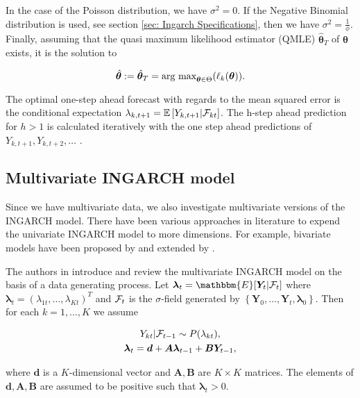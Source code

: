 In the case of the Poisson distribution, we have $\sigma^2=0$. If the Negative Binomial distribution is used, see section \ref{sec: Ingarch Specifications}, then we have $\sigma^2=\frac{1}{\phi}$. 
Finally, assuming that the quasi maximum likelihood estimator (QMLE) $\hat{\bm{\theta}}_T$ of $\bm{\theta}$ exists, it is the solution to 

\begin{equation}
\hat{\bm{\theta}}:= \hat{\bm{\theta}}_T = \text{arg max}_{\bm{\theta} \in \Theta} (\ell_k(\bm{\theta})). 
\label{eq:ingarch qmle}
\end{equation}

The optimal one-step ahead forecast with regards to the mean squared error is the conditional expectation $\lambda_{k,t+1}=\mathbb{E}\left[Y_{k,t+1} | \mathcal{F}_{kt} \right]$. The h-step ahead prediction for $h>1$ is calculated iteratively with the one step ahead predictions of $Y_{k,t+1},Y_{k,t+2},\ldots$ \cite{Liboschik:2016}. 

\subsection{Multivariate INGARCH model}
\label{sec: Multivariate Ingarch}

Since we have multivariate data, we also investigate multivariate versions of the INGARCH model. There have been various approaches in literature to expend the univariate INGARCH model to more dimensions. For example, bivariate models have been proposed by \cite{Liu:2012} and  extended by \cite{Cui:2018}. 

The authors in \cite{Fokianos:2020,Fokianos:2021} introduce and review the multivariate INGARCH model on the basis of a data generating process. Let $\bm{\lambda}_t=\mathbbm{E}[\bm{Y}_t|\SigA_t]$ where $\bm{\lambda}_t = (\lambda_{1t},\ldots,\lambda_{Kt})^T$ and $\mathcal{F}_t$ is the $\sigma$-field generated by $\left\{\bm{Y}_0,\ldots,\bm{Y}_t,\bm{\lambda}_0\right\}$. Then for each $k=1,\ldots,K$ we assume

\begin{equation}
\begin{gathered}
Y_{kt} | \mathcal{F}_{t-1} \sim P(\lambda_{kt}), \\
\bm{\lambda}_t = \bm{d} + \bm{A}\bm{\lambda}_{t-1} + \bm{B}\bm{Y}_{t-1},
\label{eq:Mingarch 1}
\end{gathered}
\end{equation}

where $\bm{d}$ is a $K$-dimensional vector and $\bm{A},\bm{B}$ are $K\times K$ matrices. The elements of $\bm{d},\bm{A},\bm{B}$ are assumed to be positive such that $\bm{\lambda}_t > 0$. 

